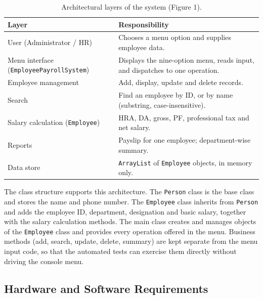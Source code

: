 \documentclass[11pt,a4paper]{article}
\begin{document}
\begin{table}[h]
\centering
\caption{Architectural layers of the system (Figure 1).}
\label{fig:arch}
\begin{tabular}{p{}p{}}
\toprule
\textbf{Layer} & \textbf{Responsibility} \\
\midrule
User (Administrator / HR) & Chooses a menu option and supplies employee data. \\
Menu interface (\texttt{EmployeePayroll\-System}) & Displays the nine-option menu, reads input, and dispatches to one operation. \\
Employee management & Add, display, update and delete records. \\
Search & Find an employee by ID, or by name (substring, case-insensitive). \\
Salary calculation (\texttt{Employee}) & HRA, DA, gross, PF, professional tax and net salary. \\
Reports & Payslip for one employee; department-wise summary. \\
Data store & \texttt{ArrayList} of \texttt{Employee} objects, in memory only. \\
\bottomrule
\end{tabular}
\end{table}

The class structure supports this architecture. The
\texttt{Person} class is the base class and stores the name and phone
number. The \texttt{Employee} class inherits from \texttt{Person}
and adds the employee ID, department, designation and basic salary,
together with the salary calculation methods. The main class creates
and manages objects of the \texttt{Employee} class and provides every
operation offered in the menu. Business methods (add, search, update,
delete, summary) are kept separate from the menu input code, so that
the automated tests can exercise them directly without driving the
console menu.

\subsection{Hardware and Software Requirements}
\end{document}
